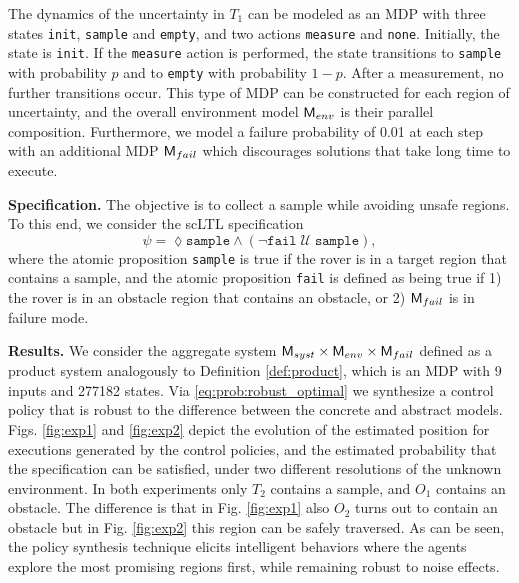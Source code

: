 \documentclass{ifacconf}
\begin{document}
The dynamics of the uncertainty in $T_1$ can be modeled as an MDP with three states \texttt{init}, \texttt{sample} and \texttt{empty}, and two actions \texttt{measure} and \texttt{none}. Initially, the state is \texttt{init}. If the \texttt{measure} action is performed, the state transitions to \texttt{sample} with probability $p$ and to \texttt{empty} with probability $1-p$. After a measurement, no further transitions occur. This type of MDP can be constructed for each region of uncertainty, and the overall environment model $\mathsf{M}_{env}$ is their parallel composition. Furthermore, we model a failure probability of 0.01 at each step with an additional MDP $\mathsf{M}_{fail}$ which discourages solutions that take long time to execute.

\textbf{Specification.} The objective is to collect a sample while avoiding unsafe regions. To this end, we consider the scLTL specification
\begin{equation}
  \psi = \lozenge \texttt{sample} \land \left( \lnot \texttt{fail} \; \mathcal {U} \; \texttt{sample} \right),
\end{equation}
where the atomic proposition \texttt{sample} is true if the rover is in a target region that contains a sample, and the atomic proposition \texttt{fail} is defined as being true if 1) the rover is in an obstacle region that contains an obstacle, or 2) $\mathsf{M}_{fail}$ is in failure mode.

\textbf{Results.} We consider the aggregate system $\mathsf{M}_{syst} \times \mathsf{M}_{env} \times \mathsf{M}_{fail}$ defined as a product system analogously to Definition \ref{def:product}, which is an MDP with 9 inputs and 277182 states. Via \eqref{eq:prob:robust_optimal} we synthesize a control policy that is robust to the difference between the concrete and abstract models. Figs. \ref{fig:exp1} and \ref{fig:exp2} depict the evolution of the estimated position for executions generated by the control policies, and the estimated probability that the specification can be satisfied, under two different resolutions of the unknown environment. In both experiments only $T_2$ contains a sample, and $O_1$ contains an obstacle. The difference is that in Fig. \ref{fig:exp1} also $O_2$ turns out to contain an obstacle but in Fig. \ref{fig:exp2} this region can be safely traversed. As can be seen, the policy synthesis technique elicits intelligent behaviors where the agents explore the most promising regions first, while remaining robust to noise effects.
\end{document}
